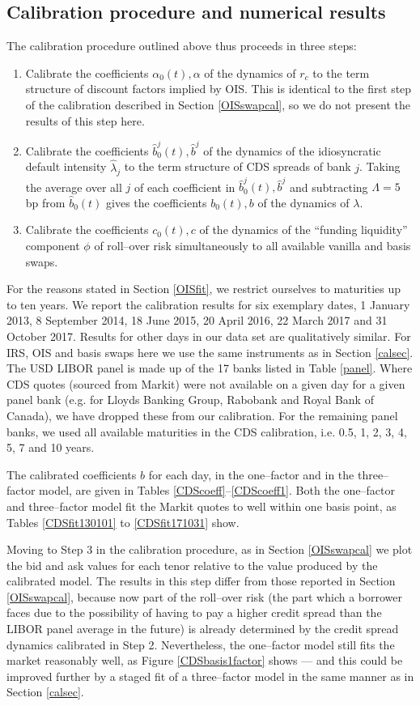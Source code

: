 \documentclass[12pt,a4paper]{article}
\theoremstyle{plain}
\numberwithin{equation}{section}
\begin{document}
\subsection{Calibration procedure and numerical results}
The calibration procedure outlined above thus proceeds in three steps:
\begin{enumerate}
\item Calibrate the coefficients $\alpha_0(t), \alpha$ of the dynamics of $r_c$ to the term structure of discount factors implied by OIS. This is identical to the first step of the calibration described in Section \ref{OISswapcal}, so we do not present the results of this step here.
\item Calibrate the coefficients $\hat b_0^j(t), \hat b^j$ of the dynamics of the idiosyncratic default intensity $\hat\lambda_j$ to the term structure of CDS spreads of bank $j$. Taking the average over all $j$ of each coefficient in $\hat b_0^j(t), \hat b^j$ and subtracting $\Lambda=5$ bp from $\hat b_0(t)$ gives the coefficients $b_0(t), b$ of the dynamics of $\lambda$.
\item Calibrate the coefficients $c_0(t), c$ of the dynamics of the ``funding liquidity'' component $\phi$ of roll--over risk simultaneously to all available vanilla and basis swaps.
\end{enumerate}
For the reasons stated in Section \ref{OISfit}, we restrict ourselves to maturities up to ten years. We report the calibration results for six exemplary dates, 1 January 2013, 8 September 2014, 18 June 2015, 20 April 2016, 22 March 2017 and 31 October 2017. Results for other days in our data set are qualitatively similar. For IRS, OIS and basis swaps here we use the same instruments as in Section \ref{calsec}. The USD LIBOR panel is made up of the 17 banks listed in Table \ref{panel}. Where CDS quotes (sourced from Markit) were not available on a given day for a given panel bank (e.g. for Lloyds Banking Group, Rabobank and Royal Bank of Canada), we have dropped these from our calibration. For the remaining panel banks, we used all available maturities in the CDS calibration, i.e. 0.5, 1, 2, 3, 4, 5, 7 and 10 years.

The calibrated coefficients $b$ for each day, in the one--factor and in the three--factor model, are given in Tables \ref{CDScoeff}--\ref{CDScoeff1}. Both the one--factor and three--factor model fit the Markit quotes to well within one basis point, as Tables \ref{CDSfit130101} to \ref{CDSfit171031} show.

Moving to Step 3 in the calibration procedure, as in Section \ref{OISswapcal} we plot the bid and ask values for each tenor relative to the value produced by the calibrated model. The results in this step differ from those reported in Section \ref{OISswapcal}, because now part of the roll--over risk (the part which a borrower faces due to the possibility of having to pay a higher credit spread than the LIBOR panel average in the future) is already determined by the credit spread dynamics calibrated in Step 2. Nevertheless, the one--factor model still fits the market reasonably well, as Figure \ref{CDSbasis1factor} shows --- and this could be improved further by a staged fit of a three--factor model in the same manner as in Section \ref{calsec}.
\end{document}

